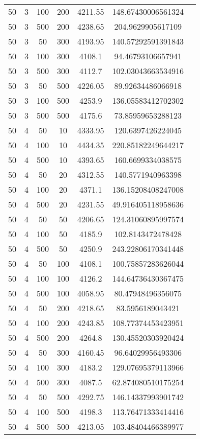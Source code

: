 {\begin{longtabu}{S
S
S
S
S
S[round-mode=places,round-precision=0]
S[round-mode=places,round-precision=0]}
50 & 3 & 100 & 200 & 4211.55 & 148.67430006561324 \\
50 & 3 & 500 & 200 & 4238.65 & 204.9629905617109 \\
50 & 3 & 50 & 300 & 4193.95 & 140.57292591391843 \\
50 & 3 & 100 & 300 & 4108.1 & 94.46793106657941 \\
50 & 3 & 500 & 300 & 4112.7 & 102.03043663534916 \\
50 & 3 & 50 & 500 & 4226.05 & 89.92634486066918 \\
50 & 3 & 100 & 500 & 4253.9 & 136.05583412702302 \\
50 & 3 & 500 & 500 & 4175.6 & 73.85959653288123 \\
50 & 4 & 50 & 10 & 4333.95 & 120.6397426224045 \\
50 & 4 & 100 & 10 & 4434.35 & 220.85182249644217 \\
50 & 4 & 500 & 10 & 4393.65 & 160.6699334038575 \\
50 & 4 & 50 & 20 & 4312.55 & 140.5771940963398 \\
50 & 4 & 100 & 20 & 4371.1 & 136.15208408247008 \\
50 & 4 & 500 & 20 & 4231.55 & 49.916405118958636 \\
50 & 4 & 50 & 50 & 4206.65 & 124.31060895997574 \\
50 & 4 & 100 & 50 & 4185.9 & 102.8143472478428 \\
50 & 4 & 500 & 50 & 4250.9 & 243.22806170341448 \\
50 & 4 & 50 & 100 & 4108.1 & 100.75857283626044 \\
50 & 4 & 100 & 100 & 4126.2 & 144.64736430367475 \\
50 & 4 & 500 & 100 & 4058.95 & 80.47948496356075 \\
50 & 4 & 50 & 200 & 4218.65 & 83.5956189043421 \\
50 & 4 & 100 & 200 & 4243.85 & 108.77374453423951 \\
50 & 4 & 500 & 200 & 4264.8 & 130.45520303920424 \\
50 & 4 & 50 & 300 & 4160.45 & 96.64029956493306 \\
50 & 4 & 100 & 300 & 4183.2 & 129.07695379113966 \\
50 & 4 & 500 & 300 & 4087.5 & 62.874080510175254 \\
50 & 4 & 50 & 500 & 4292.75 & 146.14337993901742 \\
50 & 4 & 100 & 500 & 4198.3 & 113.76471333414416 \\
50 & 4 & 500 & 500 & 4213.05 & 103.48404466389977 \\

\end{longtabu}}
